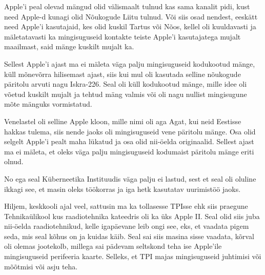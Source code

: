
Apple'i peal olevad mängud olid välismaalt tulnud kas sama kanalit pidi, kust need Apple-d kunagi olid Nõukogude Liitu tulnud. Või siis osad nendest, eeskätt need Apple'i kasutajaid, kes olid kuskil Tartus või Nõos, kellel oli kuuldavasti ja mäletatavasti ka mingisuguseid kontakte teiste Apple'i kasutajatega mujalt maailmast, said mänge kuskilt mujalt ka.


Sellest Apple'i ajast ma ei mäleta väga palju mingisuguseid kodukootud mänge, küll mõnevõrra hilisemast ajast, siis kui mul oli kasutada selline nõukogude päritolu arvuti nagu Iskra-226. Seal oli küll kodukootud mänge, mille idee oli võetud kuskilt mujalt ja tehtud mäng valmis  või oli nagu nullist mingisugune mõte mänguks vormistatud. 

Venelastel oli selline Apple kloon, mille  nimi oli aga Agat, kui neid Eestisse hakkas tulema, siis nende jaoks oli mingisuguseid vene päritolu mänge. Osa  olid selgelt Apple'i pealt maha lükatud ja osa olid  nii-öelda originaalid. Sellest ajast ma ei mäleta, et oleks väga palju mingisuguseid kodumaist päritolu mänge eriti olnud.


No ega seal Küberneetika Instituudis väga palju ei lastud, sest et seal oli oluline ikkagi see, et masin oleks töökorras ja iga hetk kasutatav  uurimistöö jaoks.

Hiljem,  keskkooli ajal veel, sattusin ma ka tollasesse TPIsse ehk siis praegune Tehnikaülikool kus raadiotehnika kateedris oli ka üks Apple II.  Seal olid siis juba nii-öelda raadiotehnikud, kelle igapäevane leib ongi see, eks, et vaadata pigem seda, mis seal kõhus on ja kuidas käib. Seal sai siis masina sisse vaadata, kõrval oli olemas  jootekolb, millega sai pädevam seltskond teha ise Apple'ile mingisuguseid perifeeria kaarte. Selleks, et TPI majas mingisuguseid juhtimisi või mõõtmisi või asju teha.  

